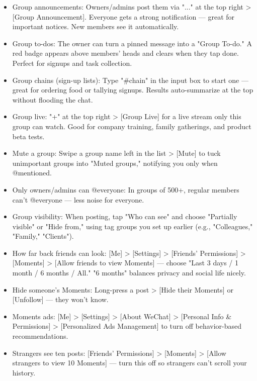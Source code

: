 \begin{itemize}
  \item Group announcements: Owners/admins post them via "..." at the top right > [Group Announcement]. Everyone gets a strong notification — great for important notices. New members see it automatically.
  \item Group to-dos: The owner can turn a pinned message into a "Group To-do." A red badge appears above members' heads and clears when they tap done. Perfect for signups and task collection.
  \item Group chains (sign-up lists): Type "\#chain" in the input box to start one — great for ordering food or tallying signups. Results auto-summarize at the top without flooding the chat.
  \item Group live: "+" at the top right > [Group Live] for a live stream only this group can watch. Good for company training, family gatherings, and product beta tests.
  \item Mute a group: Swipe a group name left in the list > [Mute] to tuck unimportant groups into "Muted groups," notifying you only when @mentioned.
  \item Only owners/admins can @everyone: In groups of 500+, regular members can't @everyone — less noise for everyone.
\end{itemize}


\begin{itemize}
  \item Group visibility: When posting, tap "Who can see" and choose "Partially visible" or "Hide from," using tag groups you set up earlier (e.g., "Colleagues," "Family," "Clients").
  \item How far back friends can look: [Me] > [Settings] > [Friends' Permissions] > [Moments] > [Allow friends to view Moments] — choose "Last 3 days / 1 month / 6 months / All." "6 months" balances privacy and social life nicely.
  \item Hide someone's Moments: Long-press a post > [Hide their Moments] or [Unfollow] — they won't know.
  \item Moments ads: [Me] > [Settings] > [About WeChat] > [Personal Info \& Permissions] > [Personalized Ads Management] to turn off behavior-based recommendations.
  \item Strangers see ten posts: [Friends' Permissions] > [Moments] > [Allow strangers to view 10 Moments] — turn this off so strangers can't scroll your history.
\end{itemize}

